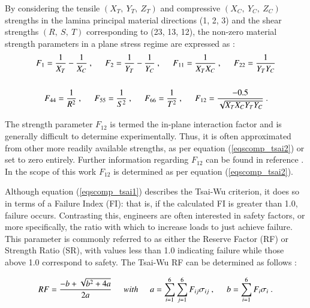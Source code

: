 By considering the tensile $(X_T,\ Y_T,\ Z_T)$ and compressive $(X_C,\ Y_C,\ Z_C)$ strengths in the lamina principal material directions (1, 2, 3) and the shear strengths $(R,\ S,\ T)$ corresponding to (23, 13, 12), the non-zero material strength parameters in a plane stress regime are expressed as \cite{reddy2004mechanics}:
\begin{gather} 
	\begin{aligned}
		&F_1 = \frac{1}{X_T} - \frac{1}{X_C}\ ,
		\hspace{5mm}
		F_2 = \frac{1}{Y_T} - \frac{1}{Y_C}\ ,
		\hspace{5mm}
		F_{11} = \frac{1}{X_TX_C}\ ,
		\hspace{5mm}
		F_{22} = \frac{1}{Y_TY_C}
		\\
		\\
		&\ \ \ \ 
		F_{44} = \frac{1}{R^2}\ ,
		\hspace{5mm}
		F_{55} = \frac{1}{S^2}\ ,
		\hspace{5mm}
		F_{66} = \frac{1}{T^2}\ ,
		\hspace{5mm}
		F_{12} = \frac{-0.5}{\sqrt{X_TX_CY_TY_C}}\ .
		\label{eqscomp_tsai2}
	\end{aligned}
\end{gather}

The strength parameter $F_{12}$ is termed the in-plane interaction factor and is generally difficult to determine experimentally. Thus, it is often approximated from other more readily available strengths, as per equation (\ref{eqscomp_tsai2}) or set to zero entirely. Further information regarding $F_{12}$ can be found in reference \cite{tsai12}. In the scope of this work $F_{12}$ is determined as per equation (\ref{eqscomp_tsai2}).

Although equation (\ref{eqscomp_tsai1}) describes the Tsai-Wu criterion, it does so in terms of a Failure Index (FI): that is, if the calculated FI is greater than 1.0, failure occurs. Contrasting this, engineers are often interested in safety factors, or more specifically, the ratio with which to increase loads to just achieve failure. This parameter is commonly referred to as either the Reserve Factor (RF) or Strength Ratio (SR), with values less than 1.0 indicating failure while those above 1.0 correspond to safety. The Tsai-Wu RF can be determined as follows \cite{kolios2012evaluation}:

\begin{equation} 
RF = \frac{-b + \sqrt{b^2 + 4a}}{2a}
\hspace{5mm}with\hspace{5mm}
a = \sum_{i=1}^{6} \sum_{j=1}^{6} F_{ij} \sigma_{ij}\ ,
\hspace{5mm}
b = \sum_{i=1}^{6} F_i \sigma_i 
\label{eqscomp_stress_recovery3}\ .
\end{equation}

